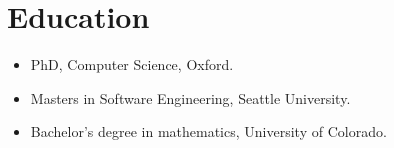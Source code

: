 \section*{Education}
\vspace{-3mm}

\begin{itemize}
  \item PhD, Computer Science, Oxford.\vspace{-3mm}
	\item Masters in Software Engineering, Seattle University.\vspace{-3mm}
	\item Bachelor's degree in mathematics, University of Colorado.
\end{itemize}

